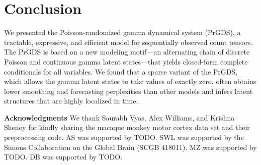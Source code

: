 \documentclass{article}
\begin{document}

\section{Conclusion} We presented the Poisson-randomized gamma dynamical system (PrGDS), a tractable, expressive, and efficient model for sequentially observed count tensors. The PrGDS is based on a new modeling motif---an alternating chain of discrete Poisson and continuous gamma latent states---that yields closed-form complete conditionals for all variables. We found that a sparse variant of the PrGDS, which allows the gamma latent states to take values of exactly zero, often obtains lower smoothing and forecasting perplexities than other models and infers latent structures that are highly localized in time.


{\small
  \textbf{Acknowledgments} \;
  We thank Saurabh Vyas, Alex Williams, and Krishna Shenoy for kindly sharing the macaque monkey motor cortex data set and their preprocessing code.  AS was supported by TODO. SWL was supported by the Simons Collaboration on the Global Brain (SCGB 418011).  MZ was supported by TODO.  DB was supported by TODO.}

\end{document}
